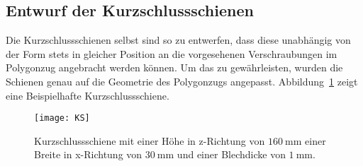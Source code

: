 \newpage


\subsection{Entwurf der Kurzschlussschienen}
Die Kurzschlussschienen selbst sind so zu entwerfen, dass diese unabh\"angig von der Form stets in gleicher Position an die vorgesehenen Verschraubungen im Polygonzug angebracht werden k\"onnen. Um das zu gew\"ahrleisten, wurden die Schienen genau auf die Geometrie des Polygonzugs angepasst. Abbildung~\ref{fig:TZKS} zeigt eine Beispielhafte Kurzschlussschiene.
\par
\begin{figure}[htb]
	\centering
	\texttt{[image: KS]}
	\caption{Kurzschlussschiene mit einer H\"ohe in z-Richtung von $\SI{160}{\milli\meter}$ einer Breite in x-Richtung von $\SI{30}{\milli\meter}$ und einer Blechdicke von $\SI{1}{\milli\meter}$.}
	\label{fig:TZKS}
\end{figure}

